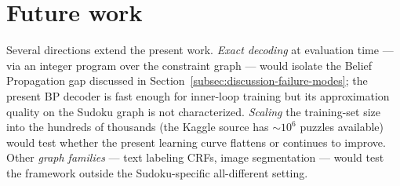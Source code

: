 \section{Future work}
\label{sec:conclusion-future}

Several directions extend the present work. \emph{Exact
decoding} at evaluation time --- via an integer program over
the constraint graph --- would isolate the Belief Propagation
gap discussed in
Section~\ref{subsec:discussion-failure-modes}; the present BP
decoder is fast enough for inner-loop training but its
approximation quality on the Sudoku graph is not characterized.
\emph{Scaling} the training-set size into the hundreds of
thousands (the Kaggle source has $\sim 10^{6}$ puzzles
available) would test whether the present learning curve
flattens or continues to improve. Other \emph{graph families}
--- text labeling CRFs, image segmentation --- would test the
framework outside the Sudoku-specific all-different setting.
